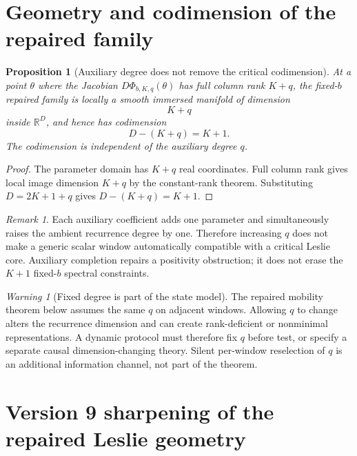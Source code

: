 \documentclass[11pt]{amsart}
\numberwithin{equation}{section}
\theoremstyle{plain}
\newtheorem{proposition}[theorem]{Proposition}
\theoremstyle{definition}
\theoremstyle{remark}
\newtheorem{remark}[theorem]{Remark}
\newtheorem{warning}[theorem]{Warning}
\begin{document}
\section{Geometry and codimension of the repaired family}
\label{sec:repaired_geometry}

\begin{proposition}[Auxiliary degree does not remove the critical codimension]
\label{prop:repaired_dimension}
At a point $\theta$ where the Jacobian $D\Phi_{b,K,q}(\theta)$ has full column rank $K+q$, the fixed-$b$ repaired family is locally a smooth immersed manifold of dimension
\begin{equation}K+q\label{eq:repaired_local_dimension}\end{equation}
inside $\mathbb R^D$, and hence has codimension
\begin{equation}D-(K+q)=K+1.\label{eq:repaired_codimension}\end{equation}
The codimension is independent of the auxiliary degree $q$.
\end{proposition}

\begin{proof}
The parameter domain has $K+q$ real coordinates. Full column rank gives local image dimension $K+q$ by the constant-rank theorem. Substituting $D=2K+1+q$ gives $D-(K+q)=K+1$.
\end{proof}

\begin{remark}
\label{rem:q_not_universal_fitter}
Each auxiliary coefficient adds one parameter and simultaneously raises the ambient recurrence degree by one. Therefore increasing $q$ does not make a generic scalar window automatically compatible with a critical Leslie core. Auxiliary completion repairs a positivity obstruction; it does not erase the $K+1$ fixed-$b$ spectral constraints.
\end{remark}

\begin{warning}[Fixed degree is part of the state model]
\label{warn:fixed_q_required}
The repaired mobility theorem below assumes the same $q$ on adjacent windows. Allowing $q$ to change alters the recurrence dimension and can create rank-deficient or nonminimal representations. A dynamic protocol must therefore fix $q$ before test, or specify a separate causal dimension-changing theory. Silent per-window reselection of $q$ is an additional information channel, not part of the theorem.
\end{warning}


\section{Version 9 sharpening of the repaired Leslie geometry}
\label{sec:v9_repaired_sharpening}
\end{document}
